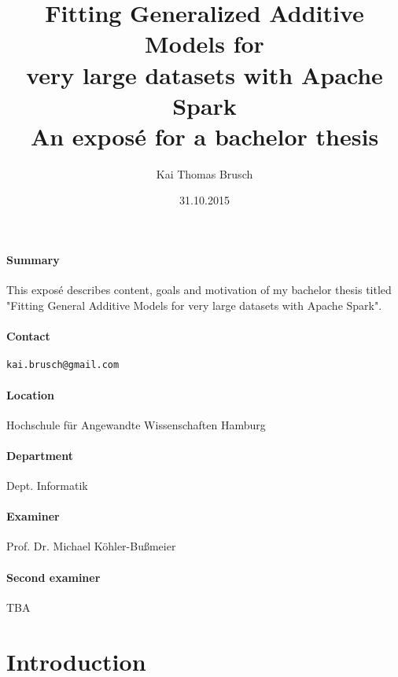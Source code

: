 \documentclass{article}
\title{
    Fitting Generalized Additive Models for\\ very large datasets with Apache Spark \\[7pt]
    \large An exposé for a bachelor thesis
}
\date{31.10.2015}
\author{Kai Thomas Brusch}
\begin{document}

    \maketitle

    \paragraph{Summary}

    This exposé describes content, goals and motivation of my bachelor thesis titled "Fitting General Additive Models for very large datasets with Apache Spark".

    \paragraph{Contact} \texttt{kai.brusch@gmail.com}

    \paragraph{Location} Hochschule für Angewandte Wissenschaften Hamburg
    \paragraph{Department} Dept. Informatik
    \paragraph{Examiner} Prof. Dr. Michael Köhler-Bußmeier
    \paragraph{Second examiner} TBA

    \newpage

    \tableofcontents

    \newpage

    \section{Introduction}
\end{document}
